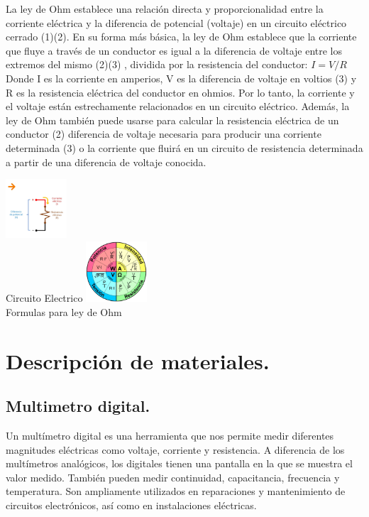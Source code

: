 \documentclass[10pt]{article}
\begin{document}
\begin{multicols}{2}
La ley de Ohm establece una relación directa y proporcionalidad entre la corriente eléctrica y la diferencia de potencial (voltaje) en un circuito eléctrico cerrado (1)(2). En su forma más básica, la ley de Ohm establece que la corriente que fluye a través de un conductor es igual a la diferencia de voltaje entre los extremos del mismo (2)(3) , dividida por la resistencia del conductor:
$I = V/R$
Donde I es la corriente en amperios, V es la diferencia de voltaje en voltios (3) y R es la resistencia eléctrica del conductor en ohmios. Por lo tanto, la corriente y el voltaje están estrechamente relacionados en un circuito eléctrico. Además, la ley de Ohm también puede usarse para calcular la resistencia eléctrica de un conductor (2) diferencia de voltaje necesaria para producir una corriente determinada (3) o la corriente que fluirá en un circuito de resistencia determinada a partir de una diferencia de voltaje conocida.
\begin{center}
	
\includegraphics[width=0.17\textwidth]{lol}\\
Circuito Electrico \newline
\includegraphics[width=0.17\textwidth]{reina}\\
Formulas para ley de Ohm

\end{center}
\section{Descripción de materiales.}

\subsection{Multimetro digital.}

Un multímetro digital es una herramienta que nos permite medir diferentes magnitudes eléctricas como voltaje, corriente y resistencia. A diferencia de los multímetros analógicos, los digitales tienen una pantalla en la que se muestra el valor medido. También pueden medir continuidad, capacitancia, frecuencia y temperatura. Son ampliamente utilizados en reparaciones y mantenimiento de circuitos electrónicos, así como en instalaciones eléctricas.


\end{multicols}
\end{document}
